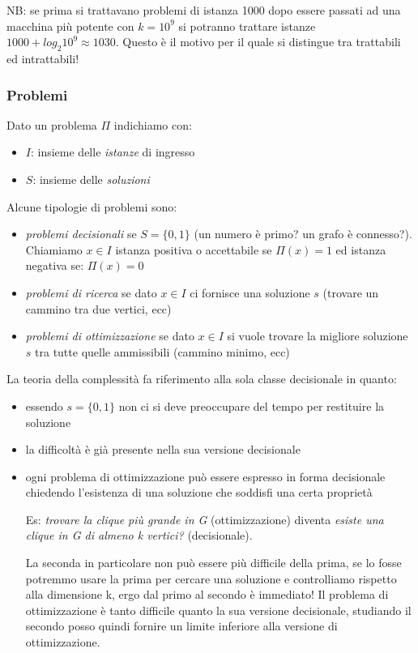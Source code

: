 NB: se prima si trattavano problemi di istanza 1000 dopo essere passati ad una macchina più potente con $k = 10^9$ si potranno trattare istanze $1000 + log_2{10^9} \approx 1030$. Questo è il motivo per il quale si distingue tra trattabili ed intrattabili!

\subsubsection{Problemi}
Dato un problema $\Pi$ indichiamo con:
\begin{itemize}
    \item $I$: insieme delle \emph{istanze} di ingresso
    \item $S$: insieme delle \emph{soluzioni}
\end{itemize}
Alcune tipologie di problemi sono:
\begin{itemize}
    \item \emph{problemi decisionali} se $S = \{0, 1\}$ (un numero è primo? un grafo è connesso?). Chiamiamo $x \in I$ istanza positiva o accettabile se $\Pi(x) = 1$ ed istanza negativa se: $\Pi(x) = 0$
    \item \emph{problemi di ricerca} se dato $x \in I$ ci fornisce una soluzione $s$ (trovare un cammino tra due vertici, ecc)
    \item \emph{problemi di ottimizzazione} se dato $x \in I$ si vuole trovare la migliore soluzione $s$ tra tutte quelle ammissibili (cammino minimo, ecc)
\end{itemize}
La teoria della complessità fa riferimento alla sola classe decisionale in quanto:
\begin{itemize}
    \item essendo $s = \{0, 1\}$ non ci si deve preoccupare del tempo per restituire la soluzione
    \item la difficoltà è già presente nella sua versione decisionale
    \item ogni problema di ottimizzazione può essere espresso in forma decisionale chiedendo l'esistenza di una soluzione che soddisfi una certa proprietà
    
    Es: \emph{trovare la clique più grande in G} (ottimizzazione) diventa \emph{esiste una clique in G di almeno k vertici?} (decisionale).
    
    La seconda in particolare non può essere più difficile della prima, se lo fosse potremmo usare la prima per cercare una soluzione e controlliamo rispetto alla dimensione k, ergo dal primo al secondo è immediato!
    Il problema di ottimizzazione è tanto difficile quanto la sua versione decisionale, studiando il secondo posso quindi fornire un limite inferiore alla versione di ottimizzazione.
\end{itemize}

